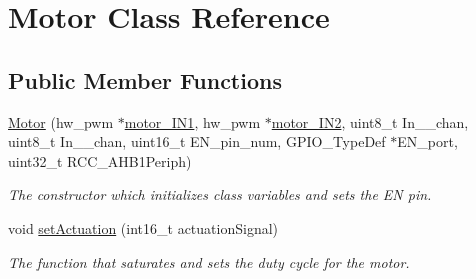 \hypertarget{classMotor}{}\section{Motor Class Reference}
\label{classMotor}
\subsection*{Public Member Functions}
\begin{DoxyCompactItemize}
\item 
\hyperlink{classMotor_af30da76dda1a2a04ce9eff1d6bcb6288}{Motor} (hw\+\_\+pwm $\ast$\hyperlink{classMotor_ac5a66a53cd8f15873185f374a0b3daa9}{motor\+\_\+\+I\+N1}, hw\+\_\+pwm $\ast$\hyperlink{classMotor_a2e359d8bde1615bb483209aa4a0f948d}{motor\+\_\+\+I\+N2}, uint8\+\_\+t In\+\_\+\_\+chan, uint8\+\_\+t In\+\_\+\_\+chan, uint16\+\_\+t E\+N\+\_\+pin\+\_\+num, G\+P\+I\+O\+\_\+\+Type\+Def $\ast$E\+N\+\_\+port, uint32\+\_\+t R\+C\+C\+\_\+\+A\+H\+B1\+Periph)
\begin{DoxyCompactList}\small\item\em The constructor which initializes class variables and sets the EN pin. \end{DoxyCompactList}\item 
void \hyperlink{classMotor_a365fc68f12da73850f0d2c122e70d0ec}{set\+Actuation} (int16\+\_\+t actuation\+Signal)
\begin{DoxyCompactList}\small\item\em The function that saturates and sets the duty cycle for the motor. \end{DoxyCompactList}\end{DoxyCompactItemize}
